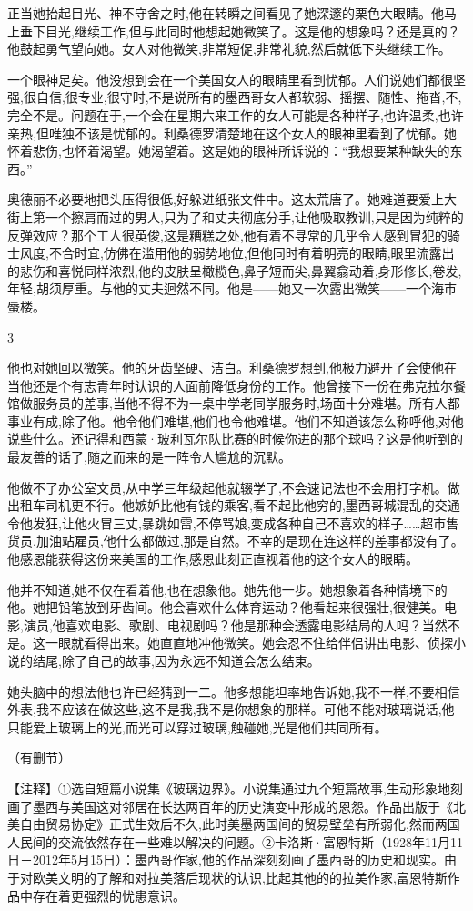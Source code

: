 \documentclass{ctexart}
\renewcommand{\\}{\par}
\begin{document}
\\正当她抬起目光、神不守舍之时,他在转瞬之间看见了她深邃的栗色大眼睛。他马上垂下目光,继续工作,但与此同时他想起她微笑了。这是他的想象吗？还是真的？他鼓起勇气望向她。女人对他微笑,非常短促,非常礼貌,然后就低下头继续工作。\\一个眼神足矣。他没想到会在一个美国女人的眼睛里看到忧郁。人们说她们都很坚强,很自信,很专业,很守时,不是说所有的墨西哥女人都软弱、摇摆、随性、拖沓,不,完全不是。问题在于,一个会在星期六来工作的女人可能是各种样子,也许温柔,也许亲热,但唯独不该是忧郁的。利桑德罗清楚地在这个女人的眼神里看到了忧郁。她怀着悲伤,也怀着渴望。她渴望着。这是她的眼神所诉说的：“我想要某种缺失的东西。” \\奥德丽不必要地把头压得很低,好躲进纸张文件中。这太荒唐了。她难道要爱上大街上第一个擦肩而过的男人,只为了和丈夫彻底分手,让他吸取教训,只是因为纯粹的反弹效应？那个工人很英俊,这是糟糕之处,他有着不寻常的几乎令人感到冒犯的骑士风度,不合时宜,仿佛在滥用他的弱势地位,但他同时有着明亮的眼睛,眼里流露出的悲伤和喜悦同样浓烈,他的皮肤呈橄榄色,鼻子短而尖,鼻翼翕动着,身形修长,卷发,年轻,胡须厚重。与他的丈夫迥然不同。他是——她又一次露出微笑——一个海市蜃楼。 \\ \begin{center} 3 \end{center} \\他也对她回以微笑。他的牙齿坚硬、洁白。利桑德罗想到,他极力避开了会使他在当他还是个有志青年时认识的人面前降低身份的工作。他曾接下一份在弗克拉尔餐馆做服务员的差事,当他不得不为一桌中学老同学服务时,场面十分难堪。所有人都事业有成,除了他。他令他们难堪,他们也令他难堪。他们不知道该怎么称呼他,对他说些什么。还记得和西蒙·玻利瓦尔队比赛的时候你进的那个球吗？这是他听到的最友善的话了,随之而来的是一阵令人尴尬的沉默。 \\他做不了办公室文员,从中学三年级起他就辍学了,不会速记法也不会用打字机。做出租车司机更不行。他嫉妒比他有钱的乘客,看不起比他穷的,墨西哥城混乱的交通令他发狂,让他火冒三丈,暴跳如雷,不停骂娘,变成各种自己不喜欢的样子……超市售货员,加油站雇员,他什么都做过,那是自然。不幸的是现在连这样的差事都没有了。他感恩能获得这份来美国的工作,感恩此刻正直视着他的这个女人的眼睛。 \\他并不知道,她不仅在看着他,也在想象他。她先他一步。她想象着各种情境下的他。她把铅笔放到牙齿间。他会喜欢什么体育运动？他看起来很强壮,很健美。电影,演员,他喜欢电影、歌剧、电视剧吗？他是那种会透露电影结局的人吗？当然不是。这一眼就看得出来。她直直地冲他微笑。她会忍不住给伴侣讲出电影、侦探小说的结尾,除了自己的故事,因为永远不知道会怎么结束。\\她头脑中的想法他也许已经猜到一二。他多想能坦率地告诉她,我不一样,不要相信外表,我不应该在做这些,这不是我,我不是你想象的那样。可他不能对玻璃说话,他只能爱上玻璃上的光,而光可以穿过玻璃,触碰她,光是他们共同所有。 \\（有删节）\\【注释】①选自短篇小说集《玻璃边界》。小说集通过九个短篇故事,生动形象地刻画了墨西与美国这对邻居在长达两百年的历史演变中形成的恩怨。作品出版于《北美自由贸易协定》正式生效后不久,此时美墨两国间的贸易壁垒有所弱化,然而两国人民间的交流依然存在一些难以解决的问题。②卡洛斯·富恩特斯（1928年11月11日－2012年5月15日）：墨西哥作家,他的作品深刻刻画了墨西哥的历史和现实。由于对欧美文明的了解和对拉美落后现状的认识,比起其他的的拉美作家,富恩特斯作品中存在着更强烈的忧患意识。
\end{document}
